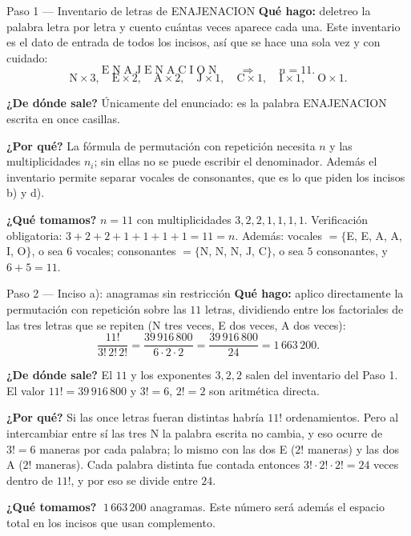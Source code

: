 \documentclass[11pt]{article}
\begin{document}
\begin{paso}{Paso 1 --- Inventario de letras de ENAJENACION}
\textbf{Qué hago:} deletreo la palabra letra por letra y cuento cuántas veces aparece cada una. Este
inventario es el dato de entrada de todos los incisos, así que se hace una sola vez y con cuidado:
\[
\text{E}\;\text{N}\;\text{A}\;\text{J}\;\text{E}\;\text{N}\;\text{A}\;\text{C}\;\text{I}\;\text{O}\;\text{N}
\qquad\Longrightarrow\qquad n=11 .
\]
\[
\text{N}\times 3,\quad \text{E}\times 2,\quad \text{A}\times 2,\quad
\text{J}\times 1,\quad \text{C}\times 1,\quad \text{I}\times 1,\quad \text{O}\times 1 .
\]

\textbf{¿De dónde sale?} Únicamente del enunciado: es la palabra ENAJENACION escrita en once casillas.

\textbf{¿Por qué?} La fórmula de permutación con repetición necesita $n$ y las multiplicidades $n_i$; sin
ellas no se puede escribir el denominador. Además el inventario permite separar vocales de consonantes,
que es lo que piden los incisos b) y d).

\textbf{¿Qué tomamos?} $n=11$ con multiplicidades $3,2,2,1,1,1,1$. Verificación obligatoria:
$3+2+2+1+1+1+1=11=n$. Además: vocales $=\{$E, E, A, A, I, O$\}$, o sea $6$ vocales; consonantes
$=\{$N, N, N, J, C$\}$, o sea $5$ consonantes, y $6+5=11$.
\end{paso}

\begin{paso}{Paso 2 --- Inciso a): anagramas sin restricción}
\textbf{Qué hago:} aplico directamente la permutación con repetición sobre las $11$ letras, dividiendo
entre los factoriales de las tres letras que se repiten (N tres veces, E dos veces, A dos veces):
\[
\frac{11!}{3!\,2!\,2!}=\frac{39\,916\,800}{6\cdot 2\cdot 2}=\frac{39\,916\,800}{24}=1\,663\,200 .
\]

\textbf{¿De dónde sale?} El $11$ y los exponentes $3,2,2$ salen del inventario del Paso 1. El valor
$11!=39\,916\,800$ y $3!=6$, $2!=2$ son aritmética directa.

\textbf{¿Por qué?} Si las once letras fueran distintas habría $11!$ ordenamientos. Pero al intercambiar
entre sí las tres N la palabra escrita no cambia, y eso ocurre de $3!=6$ maneras por cada palabra; lo
mismo con las dos E ($2!$ maneras) y las dos A ($2!$ maneras). Cada palabra distinta fue contada entonces
$3!\cdot 2!\cdot 2!=24$ veces dentro de $11!$, y por eso se divide entre $24$.

\textbf{¿Qué tomamos?} $\;1\,663\,200$ anagramas. Este número será además el espacio total en los incisos
que usan complemento.
\end{paso}
\end{document}
